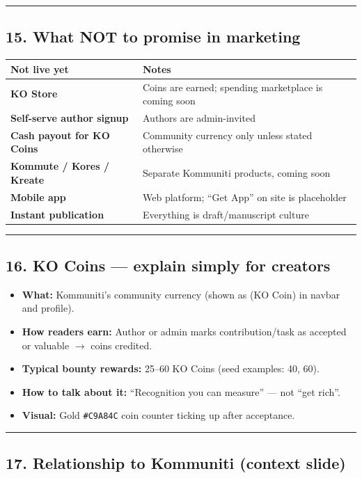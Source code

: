 \documentclass[11pt,a4paper]{report}
\begin{document}
\medskip\hrule\medskip

\subsection{15. What NOT to promise in marketing}

\begin{longtable}{|l|l|}
\hline
Not live yet & Notes \\ \hline
\textbf{KO Store} & Coins are earned; spending marketplace is coming soon \\ \hline
\textbf{Self-serve author signup} & Authors are admin-invited \\ \hline
\textbf{Cash payout for KO Coins} & Community currency only unless stated otherwise \\ \hline
\textbf{Kommute / Kores / Kreate} & Separate Kommuniti products, coming soon \\ \hline
\textbf{Mobile app} & Web platform; “Get App” on site is placeholder \\ \hline
\textbf{Instant publication} & Everything is draft/manuscript culture \\
\hline
\end{longtable}


\medskip\hrule\medskip

\subsection{16. KO Coins --- explain simply for creators}

\begin{itemize}
  \item \textbf{What:} Kommuniti’s community currency (shown as (KO Coin) in navbar and profile).
  \item \textbf{How readers earn:} Author or admin marks contribution/task as accepted or valuable $\rightarrow$ coins credited.
  \item \textbf{Typical bounty rewards:} 25--60 KO Coins (seed examples: 40, 60).
  \item \textbf{How to talk about it:} “Recognition you can measure” --- not “get rich”.
  \item \textbf{Visual:} Gold \texttt{\#C9A84C} coin counter ticking up after acceptance.
\end{itemize}

\medskip\hrule\medskip

\subsection{17. Relationship to Kommuniti (context slide)}
\end{document}
